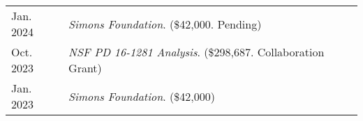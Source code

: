 
    \medskip


    \medskip
    
    \begin{center}
    {
    \renewcommand{\arraystretch}{1.5}
    \begin{longtable}{p{}  p{}}
     Jan.  2024 & \textit{Simons Foundation}. (\$42,000. Pending) \\ 
 Oct.  2023 & \textit{NSF PD 16-1281 Analysis}. (\$298,687. Collaboration Grant) \\ 
 Jan.  2023 & \textit{Simons Foundation}. (\$42,000) 
    \end{longtable}
    } 
    \end{center}

    \vspace{-1em}
    